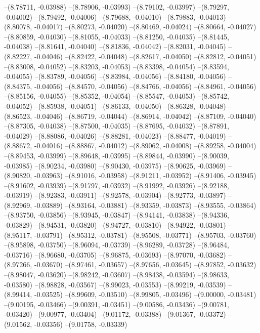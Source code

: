--(8.78711, -0.03988)
--(8.78906, -0.03993)
--(8.79102, -0.03997)
--(8.79297, -0.04002)
--(8.79492, -0.04006)
--(8.79688, -0.04010)
--(8.79883, -0.04013)
--(8.80078, -0.04017)
--(8.80273, -0.04020)
--(8.80469, -0.04024)
--(8.80664, -0.04027)
--(8.80859, -0.04030)
--(8.81055, -0.04033)
--(8.81250, -0.04035)
--(8.81445, -0.04038)
--(8.81641, -0.04040)
--(8.81836, -0.04042)
--(8.82031, -0.04045)
--(8.82227, -0.04046)
--(8.82422, -0.04048)
--(8.82617, -0.04050)
--(8.82812, -0.04051)
--(8.83008, -0.04052)
--(8.83203, -0.04053)
--(8.83398, -0.04054)
--(8.83594, -0.04055)
--(8.83789, -0.04056)
--(8.83984, -0.04056)
--(8.84180, -0.04056)
--(8.84375, -0.04056)
--(8.84570, -0.04056)
--(8.84766, -0.04056)
--(8.84961, -0.04056)
--(8.85156, -0.04055)
--(8.85352, -0.04054)
--(8.85547, -0.04053)
--(8.85742, -0.04052)
--(8.85938, -0.04051)
--(8.86133, -0.04050)
--(8.86328, -0.04048)
--(8.86523, -0.04046)
--(8.86719, -0.04044)
--(8.86914, -0.04042)
--(8.87109, -0.04040)
--(8.87305, -0.04038)
--(8.87500, -0.04035)
--(8.87695, -0.04032)
--(8.87891, -0.04029)
--(8.88086, -0.04026)
--(8.88281, -0.04023)
--(8.88477, -0.04019)
--(8.88672, -0.04016)
--(8.88867, -0.04012)
--(8.89062, -0.04008)
--(8.89258, -0.04004)
--(8.89453, -0.03999)
--(8.89648, -0.03995)
--(8.89844, -0.03990)
--(8.90039, -0.03985)
--(8.90234, -0.03980)
--(8.90430, -0.03975)
--(8.90625, -0.03969)
--(8.90820, -0.03963)
--(8.91016, -0.03958)
--(8.91211, -0.03952)
--(8.91406, -0.03945)
--(8.91602, -0.03939)
--(8.91797, -0.03932)
--(8.91992, -0.03926)
--(8.92188, -0.03919)
--(8.92383, -0.03911)
--(8.92578, -0.03904)
--(8.92773, -0.03897)
--(8.92969, -0.03889)
--(8.93164, -0.03881)
--(8.93359, -0.03873)
--(8.93555, -0.03864)
--(8.93750, -0.03856)
--(8.93945, -0.03847)
--(8.94141, -0.03838)
--(8.94336, -0.03829)
--(8.94531, -0.03820)
--(8.94727, -0.03810)
--(8.94922, -0.03801)
--(8.95117, -0.03791)
--(8.95312, -0.03781)
--(8.95508, -0.03771)
--(8.95703, -0.03760)
--(8.95898, -0.03750)
--(8.96094, -0.03739)
--(8.96289, -0.03728)
--(8.96484, -0.03716)
--(8.96680, -0.03705)
--(8.96875, -0.03693)
--(8.97070, -0.03682)
--(8.97266, -0.03670)
--(8.97461, -0.03657)
--(8.97656, -0.03645)
--(8.97852, -0.03632)
--(8.98047, -0.03620)
--(8.98242, -0.03607)
--(8.98438, -0.03594)
--(8.98633, -0.03580)
--(8.98828, -0.03567)
--(8.99023, -0.03553)
--(8.99219, -0.03539)
--(8.99414, -0.03525)
--(8.99609, -0.03510)
--(8.99805, -0.03496)
--(9.00000, -0.03481)
--(9.00195, -0.03466)
--(9.00391, -0.03451)
--(9.00586, -0.03436)
--(9.00781, -0.03420)
--(9.00977, -0.03404)
--(9.01172, -0.03388)
--(9.01367, -0.03372)
--(9.01562, -0.03356)
--(9.01758, -0.03339)
